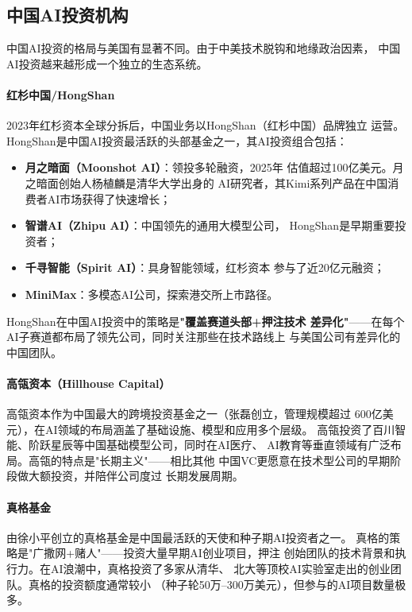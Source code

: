\subsection{中国AI投资机构}
\label{subsec:fund-china-vc}

中国AI投资的格局与美国有显著不同。由于中美技术脱钩和地缘政治因素，
中国AI投资越来越形成一个独立的生态系统。

\paragraph{红杉中国/HongShan}

2023年红杉资本全球分拆后，中国业务以HongShan（红杉中国）品牌独立
运营。HongShan是中国AI投资最活跃的头部基金之一，其AI投资组合包括：
\begin{itemize}
  \item \textbf{月之暗面（Moonshot AI）}：领投多轮融资，2025年
    估值超过100亿美元。月之暗面创始人杨植麟是清华大学出身的
    AI研究者，其Kimi系列产品在中国消费者AI市场获得了快速增长；
  \item \textbf{智谱AI（Zhipu AI）}：中国领先的通用大模型公司，
    HongShan是早期重要投资者；
  \item \textbf{千寻智能（Spirit AI）}：具身智能领域，红杉资本
    参与了近20亿元融资；
  \item \textbf{MiniMax}：多模态AI公司，探索港交所上市路径。
\end{itemize}

HongShan在中国AI投资中的策略是\textbf{"覆盖赛道头部+押注技术
差异化"}——在每个AI子赛道都布局了领先公司，同时关注那些在技术路线上
与美国公司有差异化的中国团队。

\paragraph{高瓴资本（Hillhouse Capital）}

高瓴资本作为中国最大的跨境投资基金之一（张磊创立，管理规模超过
600亿美元），在AI领域的布局涵盖了基础设施、模型和应用多个层级。
高瓴投资了百川智能、阶跃星辰等中国基础模型公司，同时在AI医疗、
AI教育等垂直领域有广泛布局。高瓴的特点是"长期主义"——相比其他
中国VC更愿意在技术型公司的早期阶段做大额投资，并陪伴公司度过
长期发展周期。

\paragraph{真格基金}

由徐小平创立的真格基金是中国最活跃的天使和种子期AI投资者之一。
真格的策略是"广撒网+赌人"——投资大量早期AI创业项目，押注
创始团队的技术背景和执行力。在AI浪潮中，真格投资了多家从清华、
北大等顶校AI实验室走出的创业团队。真格的投资额度通常较小
（种子轮50万--300万美元），但参与的AI项目数量极多。

